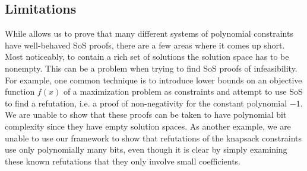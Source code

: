 \subsection{Limitations}
While  allows us to prove that many different systems of polynomial constraints have well-behaved SoS proofs, there are a few areas where it comes up short. Most noticeably, to contain a rich set of solutions the solution space has to be nonempty. This can be a problem when trying to find SoS proofs of infeasibility. For example, one common technique is to introduce lower bounds on an objective function $f(x)$ of a maximization problem as constraints and attempt to use SoS to find a refutation, i.e. a proof of non-negativity for the constant polynomial $-1$. We are unable to show that these proofs can be taken to have polynomial bit complexity since they have empty solution spaces. As another example, we are unable to use our framework to show that refutations of the knapsack constraints use only polynomially many bits, even though it is clear by simply examining these known refutations that they only involve small coefficients. 
